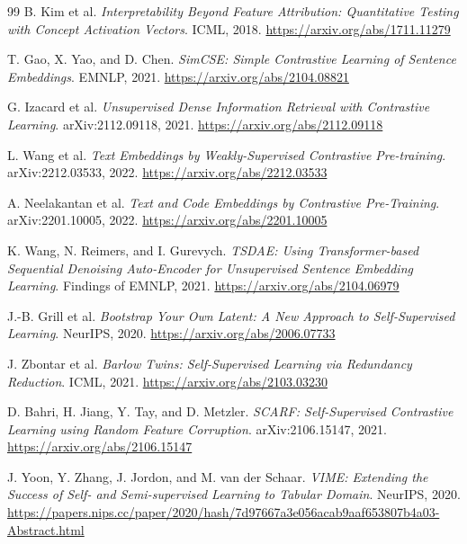 \begin{thebibliography}{99}
B. Kim et al.
\newblock \textit{Interpretability Beyond Feature Attribution: Quantitative Testing with Concept Activation Vectors}.
\newblock ICML, 2018.
\newblock \url{https://arxiv.org/abs/1711.11279}

T. Gao, X. Yao, and D. Chen.
\newblock \textit{SimCSE: Simple Contrastive Learning of Sentence Embeddings}.
\newblock EMNLP, 2021.
\newblock \url{https://arxiv.org/abs/2104.08821}

G. Izacard et al.
\newblock \textit{Unsupervised Dense Information Retrieval with Contrastive Learning}.
\newblock arXiv:2112.09118, 2021.
\newblock \url{https://arxiv.org/abs/2112.09118}

L. Wang et al.
\newblock \textit{Text Embeddings by Weakly-Supervised Contrastive Pre-training}.
\newblock arXiv:2212.03533, 2022.
\newblock \url{https://arxiv.org/abs/2212.03533}

A. Neelakantan et al.
\newblock \textit{Text and Code Embeddings by Contrastive Pre-Training}.
\newblock arXiv:2201.10005, 2022.
\newblock \url{https://arxiv.org/abs/2201.10005}

K. Wang, N. Reimers, and I. Gurevych.
\newblock \textit{TSDAE: Using Transformer-based Sequential Denoising Auto-Encoder for Unsupervised Sentence Embedding Learning}.
\newblock Findings of EMNLP, 2021.
\newblock \url{https://arxiv.org/abs/2104.06979}

J.-B. Grill et al.
\newblock \textit{Bootstrap Your Own Latent: A New Approach to Self-Supervised Learning}.
\newblock NeurIPS, 2020.
\newblock \url{https://arxiv.org/abs/2006.07733}

J. Zbontar et al.
\newblock \textit{Barlow Twins: Self-Supervised Learning via Redundancy Reduction}.
\newblock ICML, 2021.
\newblock \url{https://arxiv.org/abs/2103.03230}

D. Bahri, H. Jiang, Y. Tay, and D. Metzler.
\newblock \textit{SCARF: Self-Supervised Contrastive Learning using Random Feature Corruption}.
\newblock arXiv:2106.15147, 2021.
\newblock \url{https://arxiv.org/abs/2106.15147}

J. Yoon, Y. Zhang, J. Jordon, and M. van der Schaar.
\newblock \textit{VIME: Extending the Success of Self- and Semi-supervised Learning to Tabular Domain}.
\newblock NeurIPS, 2020.
\newblock \url{https://papers.nips.cc/paper/2020/hash/7d97667a3e056acab9aaf653807b4a03-Abstract.html}


\end{thebibliography}
